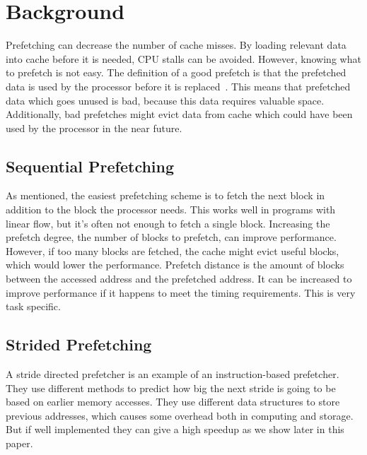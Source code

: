 \section{Background} %



Prefetching can decrease the number of cache misses. By loading
relevant data into cache before it is needed, CPU stalls can be
avoided. However, knowing what to prefetch is not easy. The definition
of a good prefetch is that the prefetched data is used by the
processor before it is
replaced~\cite{srinivasan_davidson_tyson_2004}. This means that
prefetched data which goes unused is bad, because this data requires
valuable space. Additionally, bad prefetches might evict data from
cache which could have been used by the processor in the near future.

\subsection{Sequential Prefetching}

As mentioned, the easiest prefetching scheme is to fetch the next
block in addition to the block the processor needs. This works well in
programs with linear flow, but it's often not enough to fetch a single
block. Increasing the prefetch degree, the number of blocks to
prefetch, can improve performance. However, if too many blocks are
fetched, the cache might evict useful blocks, which would lower the
performance. Prefetch distance is the amount of blocks between the
accessed address and the prefetched address. It can be increased to
improve performance if it happens to meet the timing requirements.
This is very task specific. 

\subsection{Strided Prefetching}

A stride directed prefetcher is an example of an instruction-based
prefetcher. They use different methods to predict how big the next
stride is going to be based on earlier memory accesses. They use
different data structures to store previous addresses, which causes
some overhead both in computing and storage. But if well implemented
they can give a high speedup as we show later in this paper.

